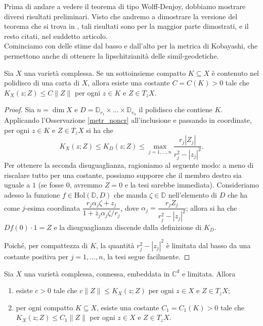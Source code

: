 Prima di andare a vedere il teorema di tipo Wolff-Denjoy, dobbiamo mostrare diversi risultati preliminari. Visto che andremo a dimostrare la versione del teorema che si trova in \cite{CMS}, tali risultati sono per la maggior parte dimostrati, e il resto citati, nel suddetto articolo. \\

Cominciamo con delle stime dal basso e dall'alto per la metrica di Kobayashi, che permettono anche di ottenere la lipschitzianità delle simil-geodetiche.

\begin{lm} \label{polycpt}
    Sia $X$ una varietà complessa. Se un sottoinsieme compatto $K\subseteq X$ è contenuto nel polidisco di una carta di $X$, allora esiste una costante $C=C(K)>0$ tale che $K_X(z;Z) \le C\|Z\|$ per ogni $z \in K$ e $Z \in T_zX$.
\end{lm}

\begin{proof}
    Sia $n=\dim{X}$ e $D=\mathbb{D}_{r_1}\times\dots\times\mathbb{D}_{r_n}$ il polidisco che contiene $K$. Applicando l'Osservazione \ref{metr_noncr} all'inclusione e passando in coordinate, per ogni $z \in K$ e $Z \in T_zX$ si ha che
    $$K_X(z;Z) \le K_D(z;Z) \le \max_{j=1,\dots,n} \frac{r_j|Z_j|}{r_j^2-|z_j|^2}.$$
    Per ottenere la seconda disuguaglianza, ragioniamo al seguente modo: a meno di riscalare tutto per una costante, possiamo supporre che il membro destro sia uguale a $1$ (se fosse $0$, avremmo $Z=0$ e la tesi sarebbe immediata). Consideriamo adesso la funzione $f\in\text{Hol}(\mathbb{D},D)$ che manda $\zeta\in\mathbb{D}$ nell'elemento di $D$ che ha come $j$-esima coordinata $\dfrac{r_j\alpha_j\zeta+z_j}{1+\bar{z}_j\alpha_j\zeta/r_j}$, dove $\alpha_j=\dfrac{r_jZ_j}{r_j^2-|z_j|^2}$; allora si ha che $Df(0)\cdot 1=Z$ e la disuguaglianza discende dalla definizione di $K_D$.
    
    Poiché, per compattezza di $K$, la quantità $r_j^2-|z_j|^2$ è limitata dal basso da una costante positiva per $j=1,\dots,n$, la tesi segue facilmente.
\end{proof}

\begin{prop} \label{metrica_bilip}
    Sia $X$ una varietà complessa, connessa, embeddata in $\mathbb{C}^d$ e limitata. Allora
    \begin{enumerate}[label={(\arabic*)}]
        \item esiste $c>0$ tale che $c\|Z\| \le K_X(z;Z)$ per ogni $z \in X$ e $Z \in T_zX$;
        \item per ogni compatto $K\subseteq X$, esiste una costante $C_1=C_1(K)>0$ tale che $K_X(z;Z) \le C_1\|Z\|$ per ogni $z \in X$ e $Z \in T_zX$.
    \end{enumerate}
\end{prop}

